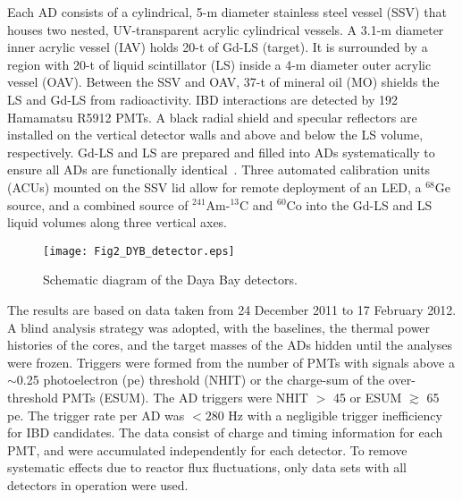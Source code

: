 \documentclass[aps,prl,showpacs,showkeys,amsmath,amssymb,
twocolumn,
floatfix,
superscriptaddress
]{revtex4-1}
\begin{document}
\par
Each AD consists of a cylindrical, 5-m diameter stainless steel vessel (SSV) that houses two nested, UV-transparent acrylic cylindrical vessels.  A 3.1-m diameter inner acrylic vessel (IAV) holds 20-t of Gd-LS (target). It is surrounded by a region with 20-t of liquid scintillator (LS) inside a 4-m diameter outer acrylic vessel (OAV)\@.  Between the SSV and OAV, 37-t of mineral oil (MO) shields the LS and Gd-LS from radioactivity. IBD interactions are detected by 192 Hamamatsu R5912 PMTs. A black radial shield and specular reflectors are installed on the vertical detector walls and above and below the LS volume, respectively. Gd-LS and LS are prepared and filled into ADs systematically to ensure all ADs are functionally identical~\cite{ad12}.
Three automated calibration units (ACUs) mounted on the SSV lid allow for remote
deployment of an LED, a $^{68}$Ge source, and a combined source of
$^{241}$Am-$^{13}$C and $^{60}$Co into the Gd-LS and LS liquid volumes along
three vertical axes.

\begin{figure}[htb]
\texttt{[image: Fig2\_DYB\_detector.eps]}
\caption{Schematic diagram of the Daya Bay detectors. \label{fig:det}}
\end{figure}



\par
The results are based on data taken from 24 December 2011 to 17 February
2012.  A blind analysis strategy was adopted, with the baselines, the thermal
power histories of the cores, and the target masses of the ADs hidden until the analyses were frozen.
Triggers were formed from the number of PMTs with signals above a $\sim$0.25 photoelectron (pe) threshold
(NHIT) or the charge-sum of the over-threshold PMTs (ESUM)\@.
The AD triggers were NHIT $>$ 45 or ESUM $\gtrsim$ 65 pe.
The trigger rate per AD was $<\!280$ Hz with a negligible trigger inefficiency for IBD candidates.
The data consist of charge and timing information for each PMT, and were accumulated independently for each detector.
To remove systematic effects due to reactor flux fluctuations, only data sets with all detectors in operation were used.
\end{document}
